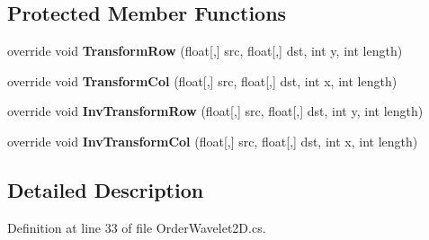 \subsection*{\-Protected \-Member \-Functions}
\begin{DoxyCompactItemize}
\item 
\hypertarget{class_turbo_wavelets_1_1_order_wavelet2_d_af45baa14b0d867362b989db7d41f14dc}{override void {\bfseries \-Transform\-Row} (float\mbox{[},\mbox{]} src, float\mbox{[},\mbox{]} dst, int y, int length)}\label{class_turbo_wavelets_1_1_order_wavelet2_d_af45baa14b0d867362b989db7d41f14dc}

\item 
\hypertarget{class_turbo_wavelets_1_1_order_wavelet2_d_a94c72dd8852fe900901bcffd12c37272}{override void {\bfseries \-Transform\-Col} (float\mbox{[},\mbox{]} src, float\mbox{[},\mbox{]} dst, int x, int length)}\label{class_turbo_wavelets_1_1_order_wavelet2_d_a94c72dd8852fe900901bcffd12c37272}

\item 
\hypertarget{class_turbo_wavelets_1_1_order_wavelet2_d_a67a15c5e174f2bf762d153a976f86b36}{override void {\bfseries \-Inv\-Transform\-Row} (float\mbox{[},\mbox{]} src, float\mbox{[},\mbox{]} dst, int y, int length)}\label{class_turbo_wavelets_1_1_order_wavelet2_d_a67a15c5e174f2bf762d153a976f86b36}

\item 
\hypertarget{class_turbo_wavelets_1_1_order_wavelet2_d_ae7e013e9ee79f1d0932de6fa2e1854de}{override void {\bfseries \-Inv\-Transform\-Col} (float\mbox{[},\mbox{]} src, float\mbox{[},\mbox{]} dst, int x, int length)}\label{class_turbo_wavelets_1_1_order_wavelet2_d_ae7e013e9ee79f1d0932de6fa2e1854de}

\end{DoxyCompactItemize}


\subsection{\-Detailed \-Description}


\-Definition at line 33 of file \-Order\-Wavelet2\-D.\-cs.



